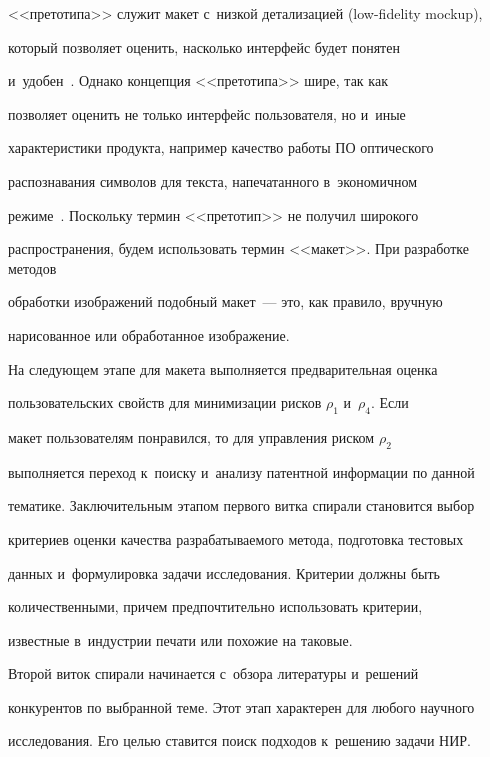 <<претотипа>> служит макет с~низ\-кой детализацией (low-fidelity mockup), 


который поз\-во\-ля\-ет оценить, насколько интерфейс будет понятен 


и~удобен~\cite{11-mat}. Однако концепция <<претотипа>> шире, так как 


поз\-во\-ля\-ет оценить не только интерфейс пользователя, но и~иные 


характеристики продукта, например качество работы ПО оптического 


рас\-по\-зна\-ва\-ния символов для текс\-та, напечатанного в~экономичном 


режиме~\cite{9-mat}. Поскольку термин <<претотип>> не получил широкого 


рас\-про\-стра\-не\-ния, будем использовать тер\-мин <<макет>>. При разработке методов 


обработки изоб\-ра\-же\-ний подобный макет~--- это, как правило, вруч\-ную 


нарисованное или обработанное изобра\-же\-ние.








  На следующем этапе для макета выполняется предварительная оцен\-ка 


пользовательских свойств для минимизации рис\-ков $\rho_1$ и~$\rho_4$. Если 


макет пользователям понравился, то для управ\-ле\-ния риском $\rho_2$ 


выполняется переход к~поиску и~анализу патентной информации по данной 


тематике. Заключительным этапом первого вит\-ка спирали становится выбор 


критериев оцен\-ки качества раз\-ра\-ба\-ты\-ва\-емо\-го метода, подготовка тес\-то\-вых 


данных и~формулировка задачи исследования. Критерии долж\-ны быть 


количественными, причем предпочтительно использовать критерии, 


известные в~индустрии печати или похожие на таковые. 


  


  Второй виток спирали начинается с~обзора литературы и~решений 


конкурентов по выбранной теме. Этот этап характерен для любого научного 


исследования. Его целью ставится поиск подходов к~решению задачи НИР. 


